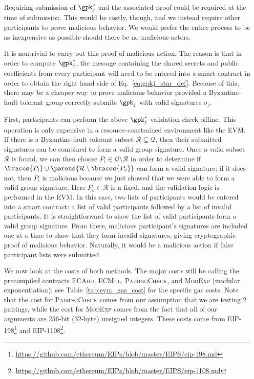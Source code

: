 \noindent
Requiring submission of $\gpk_{j}^{*}$ and the associated
proof could be required at the time of submission.
This would be costly, though, and we instead require
other participants to prove malicious behavior.
We would prefer the entire process to be as inexpensive
as possible should there be no malicious actors.

It is nontrivial to carry out this proof of malicious action.
The reason is that in order to compute $\gpk_{j}^{*}$,
the message containing the shared secrets and public coefficients
from every participant will need to be entered into a smart contract
in order to obtain the right hand side of
Eq.~\eqref{eq:gpkj_star_def}.
Because of this, there may be a cheaper way to prove malicious
behavior provided a Byzantine-fault tolerant group
correctly submits $\gpk_{j}$ with valid signatures $\sigma_{j}$.

First, participants can perform the above $\gpk_{j}^{*}$ validation
check offline.
This operation is only expensive in a resource-constrained
environment like the EVM.
If there is a Byzantine-fault tolerant subset
$\mathcal{R}\subseteq\mathcal{Q}$,
then their submitted signatures can be combined to form a valid
group signature.
Once a valid subset $\mathcal{R}$ is found,
we can then choose $P_{i}\in\mathcal{Q}\setminus\mathcal{R}$
in order to determine if
$\braces{P_{i}}\cup\parens{\mathcal{R}\setminus \braces{P_{v}}}$
can form a valid signature;
if it does not, then $P_{i}$ is malicious
because we just showed that we were able to form a valid group signature.
Here $P_{v}\in\mathcal{R}$ is a fixed, and the validation logic
is performed in the EVM.
In this case, two lists of participants would be entered into a smart
contract: a list of valid participants followed by a list of
invalid participants.
It is straightforward to show the list of valid
participants form a valid group signature.
From there, malicious participant's signatures are included 
one at a time to show that they form invalid signatures,
giving cryptographic proof of malicious behavior.
Naturally, it would be a malicious action if false participant
lists were submitted.

We now look at the costs of both methods.
The major costs will be calling the precompiled contracts
\textsc{ECAdd}, \textsc{ECMul}, \textsc{PairingCheck},
and \textsc{ModExp} (modular exponentiation);
see Table~\ref{tab:evm_gas_cost} for the specific gas costs.
Note that the cost for \textsc{PairingCheck} comes
from our assumption that we are testing 2 pairings,
while the cost for \textsc{ModExp} comes from the fact
that all of our arguments are 256-bit (32-byte) unsigned integers.
These costs come from EIP-198\footnote{
    \url{https://github.com/ethereum/EIPs/blob/master/EIPS/eip-198.md}}
and EIP-1108\footnote{
    \url{https://github.com/ethereum/EIPs/blob/master/EIPS/eip-1108.md}}.


